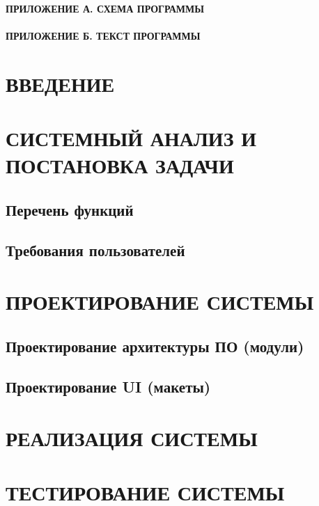 \documentclass[12pt, a4paper, simple]{eskdtext}
\begin{document}
    

    \tableofcontents                                
    \paragraph{ПРИЛОЖЕНИЕ А. СХЕМА ПРОГРАММЫ}
    \paragraph{ПРИЛОЖЕНИЕ Б. ТЕКСТ ПРОГРАММЫ}
    \newpage

    \section*{ВВЕДЕНИЕ}
    \newpage

    \section{СИСТЕМНЫЙ АНАЛИЗ И ПОСТАНОВКА ЗАДАЧИ}
    \subsection{Перечень функций}
    \subsection{Требования пользователей}
    \newpage

    \section{ПРОЕКТИРОВАНИЕ СИСТЕМЫ}
    \subsection{Проектирование архитектуры ПО (модули)}
    \subsection{Проектирование UI (макеты)}
    \newpage

    \section{РЕАЛИЗАЦИЯ СИСТЕМЫ}
    \newpage

    \section{ТЕСТИРОВАНИЕ СИСТЕМЫ}
    \newpage
\end{document}
